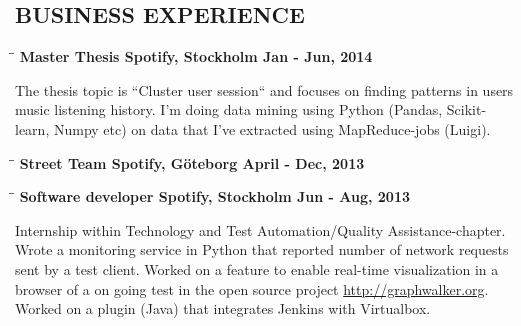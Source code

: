 \documentclass[11pt]{res}
\begin{document}
\begin{resume}
\section{BUSINESS EXPERIENCE}
\vspace{-0.1in}
\begin{tabbing}
 \hspace{2.3in}\= \hspace{2.6in}\= \kill %
\bf {Master Thesis} \>Spotify, Stockholm \>Jan - Jun, 2014
\end{tabbing}\vspace{-20pt}
The thesis topic is ``Cluster user session`` and focuses on finding patterns in users music listening
history. I'm doing data mining using Python (Pandas, Scikit-learn, Numpy etc) on data that
I've extracted using MapReduce-jobs (Luigi).
\vspace{-20pt}
\begin{tabbing}
 \hspace{2.3in}\= \hspace{2.6in}\= \kill %
 \bf {Street Team} \>Spotify, Göteborg \>April - Dec, 2013\\
\end{tabbing}\vspace{-40pt}
\begin{tabbing}
 \hspace{2.3in}\= \hspace{2.6in}\= \kill %
 \bf {Software developer} \>Spotify, Stockholm \> Jun - Aug, 2013
\end{tabbing}\vspace{-20pt}
Internship within Technology and Test Automation/Quality Assistance-chapter.
Wrote a monitoring service in Python that reported number of network requests sent by a test client. Worked on a feature to enable real-time visualization in a browser of a on going test in the open source project \url{http://graphwalker.org}. Worked on a plugin (Java) that integrates Jenkins with Virtualbox.

\end{resume}
\end{document}

